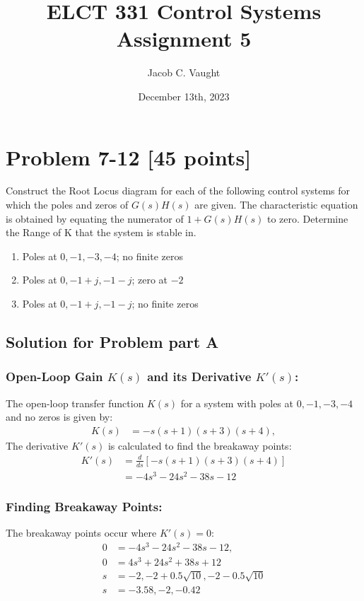 \documentclass[11pt]{article}
\begin{document}
\title{ELCT 331 Control Systems Assignment 5}
\author{Jacob C. Vaught}
\date{December 13th, 2023}
\maketitle

\section*{Problem 7-12 [45 points]}
Construct the Root Locus diagram for each of the following control systems for which the poles and zeros of \( G(s)H(s) \) are given. The characteristic equation is obtained by equating the numerator of \( 1 + G(s)H(s) \) to zero. Determine the Range of K that the system is stable in.

\begin{enumerate}
    \item Poles at \( 0, -1, -3, -4 \); no finite zeros
    \item Poles at \( 0, -1+j, -1-j \); zero at \( -2 \)
    \item Poles at \( 0, -1+j, -1-j \); no finite zeros
\end{enumerate}

\newpage
\subsection*{Solution for Problem part A}

\subsubsection*{Open-Loop Gain \( K(s) \) and its Derivative \( K'(s) \):}
The open-loop transfer function \( K(s) \) for a system with poles at \( 0, -1, -3, -4 \) and no zeros is given by:
\begin{align*}
    K(s) &= -s(s+1)(s+3)(s+4),
\end{align*}
The derivative \( K'(s) \) is calculated to find the breakaway points:
\begin{align*}
    K'(s) &= \frac{d}{ds}[-s(s+1)(s+3)(s+4)] \\
          &= -4s^3-24s^2-38s-12
\end{align*}

\subsubsection*{Finding Breakaway Points:}
The breakaway points occur where \( K'(s) = 0 \):
\begin{align*}
    0 &= -4s^3 - 24s^2 - 38s - 12, \\
    0 &= 4s^3 + 24s^2 + 38s + 12 \\
    s &= -2, -2 + 0.5\sqrt{10}, -2 - 0.5\sqrt{10} \\
    s &= -3.58, -2, -0.42
\end{align*}
\end{document}
